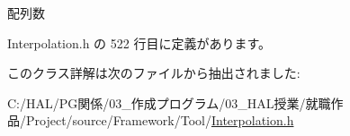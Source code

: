 配列数 



 Interpolation.\+h の 522 行目に定義があります。



このクラス詳解は次のファイルから抽出されました\+:\begin{DoxyCompactItemize}
\item 
C\+:/\+H\+A\+L/\+P\+G関係/03\+\_\+作成プログラム/03\+\_\+\+H\+A\+L授業/就職作品/\+Project/source/\+Framework/\+Tool/\mbox{\hyperlink{_interpolation_8h}{Interpolation.\+h}}\end{DoxyCompactItemize}
